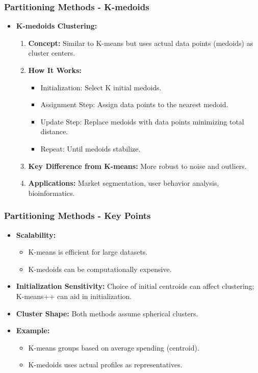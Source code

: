 \documentclass{beamer}
\begin{document}
\begin{frame}[fragile]
    \frametitle{Partitioning Methods - K-medoids}
    \begin{itemize}
        \item \textbf{K-medoids Clustering:}
        \begin{enumerate}
            \item \textbf{Concept:} Similar to K-means but uses actual data points (medoids) as cluster centers.
            \item \textbf{How It Works:}
            \begin{itemize}
                \item Initialization: Select K initial medoids.
                \item Assignment Step: Assign data points to the nearest medoid.
                \item Update Step: Replace medoids with data points minimizing total distance.
                \item Repeat: Until medoids stabilize.
            \end{itemize}
            \item \textbf{Key Difference from K-means:} More robust to noise and outliers.
            \item \textbf{Applications:} Market segmentation, user behavior analysis, bioinformatics.
        \end{enumerate}
    \end{itemize}
\end{frame}

\begin{frame}[fragile]
    \frametitle{Partitioning Methods - Key Points}
    \begin{itemize}
        \item \textbf{Scalability:} 
        \begin{itemize}
            \item K-means is efficient for large datasets.
            \item K-medoids can be computationally expensive.
        \end{itemize}
        \item \textbf{Initialization Sensitivity:} Choice of initial centroids can affect clustering; K-means++ can aid in initialization.
        \item \textbf{Cluster Shape:} Both methods assume spherical clusters.
        \item \textbf{Example:} 
        \begin{itemize}
            \item K-means groups based on average spending (centroid).
            \item K-medoids uses actual profiles as representatives.
        \end{itemize}
    \end{itemize}
\end{frame}
\end{document}
